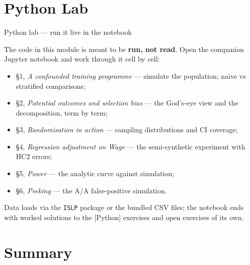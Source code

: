 \documentclass[aspectratio=169,11pt]{beamer}
\begin{document}
\section{Python Lab}

\begin{frame}{Python lab --- run it live in the notebook}
  \begin{labnote}
    The code in this module is meant to be \textbf{run, not read}. Open the companion
    Jupyter notebook and work through it cell by cell:
    \begin{itemize}
      \item \S1, \emph{A confounded training programme} --- simulate the population;
            naive vs stratified comparisons;
      \item \S2, \emph{Potential outcomes and selection bias} --- the God's-eye view and
            the decomposition, term by term;
      \item \S3, \emph{Randomisation in action} --- sampling distributions and CI coverage;
      \item \S4, \emph{Regression adjustment on Wage} --- the semi-synthetic experiment
            with HC2 errors;
      \item \S5, \emph{Power} --- the analytic curve against simulation;
      \item \S6, \emph{Peeking} --- the A/A false-positive simulation.
    \end{itemize}
    Data loads via the \texttt{ISLP} package or the bundled CSV files; the notebook ends
    with worked solutions to the [Python] exercises and open exercises of its own.
  \end{labnote}
\end{frame}

\section{Summary}
\end{document}
